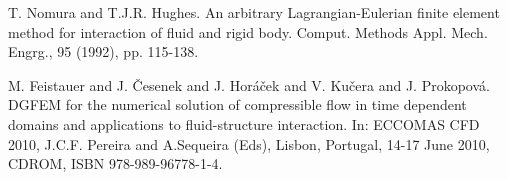 
\begin{thebibliography}{10}

{\sc T. Nomura and T.J.R. Hughes}. {An arbitrary Lagrangian-Eulerian finite element method for interaction of fluid and rigid body}. Comput. Methods Appl. Mech. Engrg., 95 (1992), pp. 115-138.



{\sc M. Feistauer and J. \v Cesenek and J. Hor\' a\v cek and V. Ku\v cera and J. Prokopov\' a}. {DGFEM for the numerical solution of compressible flow in time dependent domains and applications to fluid-structure interaction}. In: ECCOMAS CFD 2010, J.C.F. Pereira and A.Sequeira (Eds), Lisbon, Portugal, 14-17 June 2010, CDROM, ISBN 978-989-96778-1-4.

\end{thebibliography}
